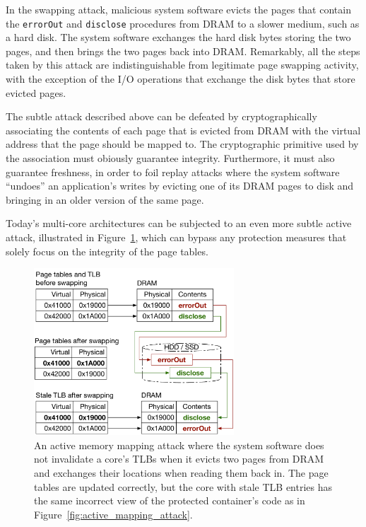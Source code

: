 In the swapping attack, malicious system software evicts the pages that contain
the \texttt{errorOut} and \texttt{disclose} procedures from DRAM to a slower
medium, such as a hard disk. The system software exchanges the hard disk
bytes storing the two pages, and then brings the two pages back into DRAM.
Remarkably, all the steps taken by this attack are indistinguishable from
legitimate page swapping activity, with the exception of the I/O operations
that exchange the disk bytes that store evicted pages.

The subtle attack described above can be defeated by cryptographically
associating the contents of each page that is evicted from DRAM with the
virtual address that the page should be mapped to. The cryptographic primitive
used by the association must obiously guarantee integrity. Furthermore, it must
also guarantee freshness, in order to foil replay attacks where the system
software ``undoes'' an application's writes by evicting one of its DRAM pages
to disk and bringing in an older version of the same page.

Today's multi-core architectures can be subjected to an even more subtle active
attack, illustrated in Figure~\ref{fig:tlb_mapping_attack}, which can bypass
any protection measures that solely focus on the integrity of the page tables.

\begin{figure}[hbt]
  \centering
  \includegraphics[width=75mm]{figures/tlb_mapping_attack.pdf}
  \caption{
    An active memory mapping attack where the system software does not
    invalidate a core's TLBs when it evicts two pages from DRAM and exchanges
    their locations when reading them back in. The page tables are updated
    correctly, but the core with stale TLB entries has the same incorrect view
    of the protected container's code as in
    Figure~\ref{fig:active_mapping_attack}.
  }
  \label{fig:tlb_mapping_attack}
\end{figure}

